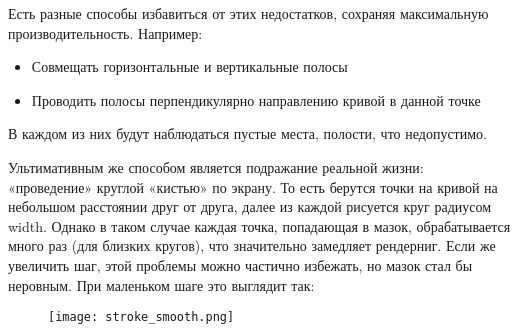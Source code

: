 Есть разные способы избавиться от этих недостатков, сохраняя максимальную производительность.
Например:
\begin{itemize}
    \item Совмещать горизонтальные и вертикальные полосы
    \item Проводить полосы перпендикулярно направлению кривой в данной точке
\end{itemize}
В каждом из них будут наблюдаться пустые места, полости, что недопустимо.

Ультимативным же способом является подражание реальной жизни: «проведение» круглой «кистью» по экрану.
То есть берутся точки на кривой на небольшом расстоянии друг от друга, далее из каждой рисуется круг радиусом width.
Однако в таком случае каждая точка, попадающая в мазок, обрабатывается много раз (для близких кругов), что значительно замедляет рендерниг.
Если же увеличить шаг, этой проблемы можно частично избежать, но мазок стал бы неровным.
При маленьком шаге это выглядит так:
\begin{figure}[h!]
    \centering
    \texttt{[image: stroke\_smooth.png]}
    \label{fig:smooth_stroke}
\end{figure}

